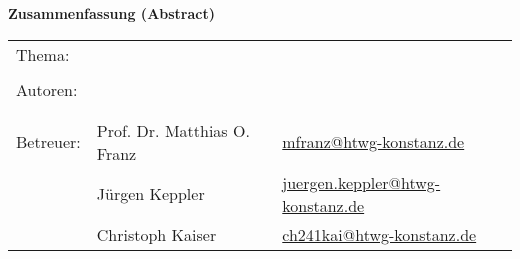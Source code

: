 
\begin{center}
{\Large \textbf{Zusammenfassung (Abstract)}}
\end{center}

\bigskip

\begin{center}
	\begin{tabular}{p{2.8cm}p{5cm}p{5cm}}
		Thema: & \multicolumn{2}{p{10cm}}{\raggedright\strTopic} \\
		 & & \\
		Autoren: & \strAuthorA & \href{mailto:\strAuthorAEmail}{\strAuthorAEmail} \\
		 & \strAuthorB & \href{mailto:\strAuthorBEmail}{\strAuthorBEmail} \\
		 & & \\
		Betreuer: & Prof. Dr. Matthias O. Franz & \href{mailto:mfranz@htwg-konstanz.de}{mfranz@htwg-konstanz.de} \\
		 &  Jürgen Keppler & \href{mailto:juergen.keppler@htwg-konstanz.de}{juergen.keppler@htwg-konstanz.de} \\
		 &  Christoph Kaiser & \href{mailto:ch241kai@htwg-konstanz.de}{ch241kai@htwg-konstanz.de} \\
	\end{tabular}
\end{center}

\bigskip

\noindent
\strAbstract

\thispagestyle{preface}


